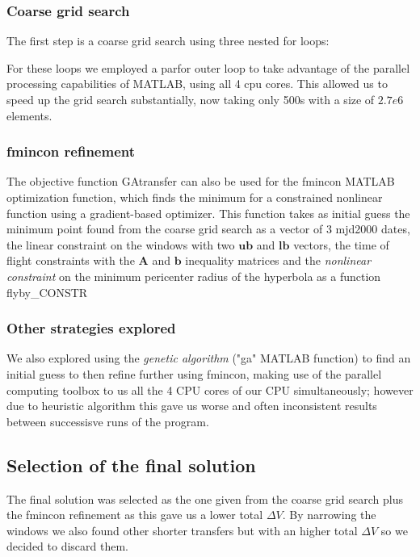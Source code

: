 \documentclass[11pt,a4paper]{report}
\renewcommand{\vec}[1]{\mathbf{#1}}
\begin{document}
\subsubsection{Coarse grid search}
The first step is a coarse grid search using three nested for loops:\\

\lstset{style=mystyle}


For these loops we employed a parfor outer loop to take advantage of the parallel processing capabilities of MATLAB, using all 4 cpu cores. This allowed us to speed up the grid search substantially, now taking only 500s with a size of $2.7e6  $ elements.

\subsubsection{fmincon refinement}
The objective function GAtransfer can also be used for the fmincon MATLAB optimization function, which finds the minimum for a constrained nonlinear function using a gradient-based optimizer. This function takes as initial guess the minimum point found from the coarse grid search as a vector of 3 mjd2000 dates, the linear constraint on the windows with two $\vec{ub}$ and $\vec{lb}$ vectors, the time of flight constraints with the $\vec{A}$ and $\vec{b}$ inequality matrices and the \emph{nonlinear constraint} on the minimum pericenter radius of the hyperbola as a function flyby\_CONSTR\\
\subsubsection{Other strategies explored}

We also explored using the \emph{genetic algorithm} ("ga" MATLAB function) to find an initial guess to then refine further using fmincon, making use of the parallel computing toolbox to us all the 4 CPU cores of our CPU simultaneously; however due to heuristic algorithm this gave us worse and often inconsistent results between successisve runs of the program.

\subsection{Selection of the final solution}
The final solution was selected as the one given from the coarse grid search plus the fmincon refinement as this gave us a lower total $\Delta V$. By narrowing the windows we also found other shorter transfers but with an higher total $\Delta V$ so we decided to discard them.
\end{document}
